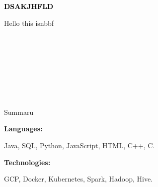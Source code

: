 \documentclass[9pt]{developercv} %
\begin{document}
    
    \begin{minipage}[t]{0.5\textwidth} 
    \vspace{-\baselineskip}
    
    \fontsize{16}{20} \textcolor{black}{\textbf{\MakeUppercase{dsakjhfld}}}
    
    \vspace{6pt}
    
    {\Large Hello this isnbbf}
    \end{minipage}
    \hfill
    \begin{minipage}[t]{0.2\textwidth}
      \vspace{-\baselineskip}
      
      \\
      \\
      \
      
    \end{minipage}
    \begin{minipage}[t]{0.27\textwidth}
      \vspace{-\baselineskip}
      
      \\
      \\
      \    
        
    \end{minipage}
    
    \begin{minipage}[t]{0.46\textwidth}
    \vspace{-6pt}

    Summaru\\
    \end{minipage}
  \hfill
    \begin{minipage}[t]{0.465\textwidth}
    \vspace{-6pt}
    
    \begin{minipage}[t]{0.2\textwidth}
        \textbf{Languages:}
    \end{minipage}
    \hfill
    \begin{minipage}[t]{0.73\textwidth}
      Java, SQL, Python, JavaScript, HTML, C++, C.  
    \end{minipage}
    \vspace{4mm}
    
    \begin{minipage}[t]{0.2\textwidth}
        \textbf{Technologies:}
    \end{minipage}
    \hfill
    \begin{minipage}[t]{0.73\textwidth}
      GCP, Docker, Kubernetes, Spark, Hadoop, Hive.
    \end{minipage}
    
\end{minipage}
    
\end{document}
